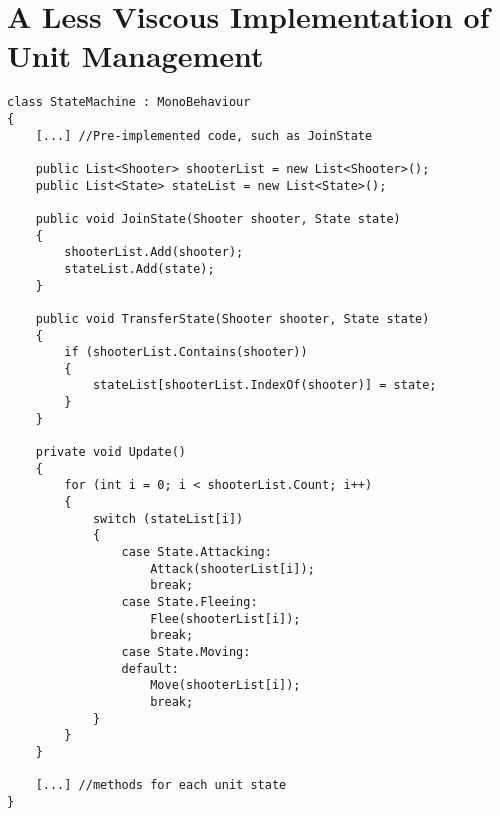 \section{A Less Viscous Implementation of Unit Management} \label{app:csharp:non:viscous}
\begin{listing}
\begin{verbatim}
class StateMachine : MonoBehaviour
{
    [...] //Pre-implemented code, such as JoinState

    public List<Shooter> shooterList = new List<Shooter>();
    public List<State> stateList = new List<State>();

    public void JoinState(Shooter shooter, State state)
    {
        shooterList.Add(shooter);
        stateList.Add(state);
    }

    public void TransferState(Shooter shooter, State state)
    {
        if (shooterList.Contains(shooter))
        {
            stateList[shooterList.IndexOf(shooter)] = state;
        }
    }

    private void Update()
    {
        for (int i = 0; i < shooterList.Count; i++)
        {
            switch (stateList[i])
            {
                case State.Attacking:
                    Attack(shooterList[i]);
                    break;
                case State.Fleeing:
                    Flee(shooterList[i]);
                    break;
                case State.Moving:
                default:
                    Move(shooterList[i]);
                    break;
            }
        }
    }

    [...] //methods for each unit state
}
\end{verbatim}
\end{listing}
